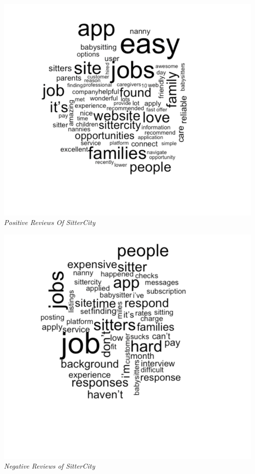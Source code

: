 \documentclass[12pt]{article}
\begin{document}
\newpage

\includegraphics{IMAGES/good reviews.png} \emph{Positive Reviews Of
SitterCity}

\newpage

\includegraphics{IMAGES/badreviews.png} \emph{Negative Reviews of
SitterCity}

\newpage


\renewcommand\refname{References}

\end{document}
